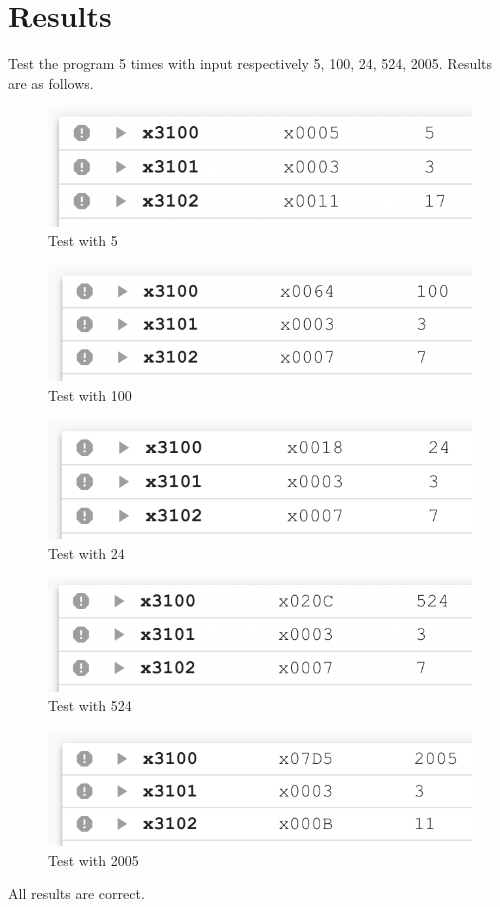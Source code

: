 \documentclass[UTF8]{ctexart}
\begin{document}
\section{Results}
Test the program 5 times with input respectively 5, 100, 24, 524, 2005. Results are as follows.
\begin{figure}[H]
  \centering
  \includegraphics[scale=0.5]{test1.png}
  \caption{Test with 5}
\end{figure}
\begin{figure}[H]
  \centering
  \includegraphics[scale=0.5]{test2.png}
  \caption{Test with 100}
\end{figure}
\begin{figure}[H]
  \centering
  \includegraphics[scale=0.5]{test3.png}
  \caption{Test with 24}
\end{figure}
\begin{figure}[H]
  \centering
  \includegraphics[scale=0.5]{test4.png}
  \caption{Test with 524}
\end{figure}
\begin{figure}[H]
  \centering
  \includegraphics[scale=0.5]{test5.png}
  \caption{Test with 2005}
\end{figure}

All results are correct.

\end{document}
